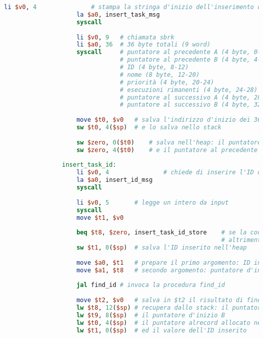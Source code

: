 \begin{center}
\begin{lstlisting}[language=mips, gobble=14, stepnumber=1]
                    li $v0, 4               # stampa la stringa d'inizio dell'inserimento di un task
                    la $a0, insert_task_msg
                    syscall
                    
                    li $v0, 9   # chiamata sbrk
                    li $a0, 36  # 36 byte totali (9 word)
                    syscall     # puntatore al precedente A (4 byte, 0-4)
                                # puntatore al precedente B (4 byte, 4-8)
                                # ID (4 byte, 8-12)
                                # nome (8 byte, 12-20)
                                # priorità (4 byte, 20-24)
                                # esecuzioni rimanenti (4 byte, 24-28)
                                # puntatore al successivo A (4 byte, 28-32)
                                # puntatore al successivo B (4 byte, 32-36)
                                
                    move $t0, $v0   # salva l'indirizzo d'inizio dei 36 byte allocati n $t0
                    sw $t0, 4($sp)	# e lo salva nello stack
                    
                    sw $zero, 0($t0)    # salva nell'heap: il puntatore al precedente A
                    sw $zero, 4($t0)    # e il puntatore al precedente B
                    
                insert_task_id:
                    li $v0, 4				# chiede di inserire l'ID del task
                    la $a0, insert_id_msg
                    syscall
                    
                    li $v0, 5		# legge un intero da input
                    syscall
                    move $t1, $v0
                    
                    beq $t8, $zero, insert_task_id_store	# se la coda è vuota, salva l'ID inserito
                											# altrimenti
                    sw $t1, 0($sp)	# salva l'ID inserito nell'heap
                    
                    move $a0, $t1	# prepare il primo argomento: ID inserito
                    move $a1, $t8	# secondo argomento: puntatore d'inizio A
                    
                    jal find_id	# invoca la procedura find_id
                    
                    move $t2, $v0	# salva in $t2 il risultato di find_id
                    lw $t8, 12($sp)	# recupera dallo stack: il puntatore d'inizio A
                    lw $t9, 8($sp)	# il puntatore d'inizio B
                    lw $t0, 4($sp)	# il puntatore alrecord allocato nell'heap
                    lw $t1, 0($sp)	# ed il valore dell'ID inserito
                    

\end{lstlisting}
\end{center}
